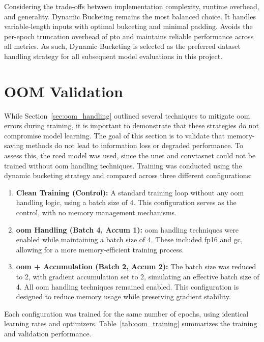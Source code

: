 Considering the trade-offs between implementation complexity, runtime overhead, and generality. Dynamic Bucketing remains the most balanced choice. It handles variable-length inputs with optimal bukceting and minimal padding. Avoids the per-epoch truncation overhead of \gls{pto} and maintains reliable performance across all metrics. As such, Dynamic Bucketing is selected as the preferred dataset handling strategy for all subsequent model evaluations in this project.

\section{OOM Validation}
\label{sec:oom_validation}

While Section~\ref{sec:oom_handling} outlined several techniques to mitigate \gls{oom} errors during training, it is important to demonstrate that these strategies do not compromise model learning. The goal of this section is to validate that memory-saving methods do not lead to information loss or degraded performance. To assess this, the \gls{rced} model was used, since the \gls{unet} and \gls{convtasnet} could not be trained without \gls{oom} handling techniques. Training was conducted using the dynamic bucketing strategy and compared across three different configurations:

\begin{enumerate}
    \item \textbf{Clean Training (Control):} A standard training loop without any \gls{oom} handling logic, using a batch size of 4. This configuration serves as the control, with no memory management mechanisms.
    
    \item \textbf{\gls{oom} Handling (Batch 4, Accum 1):} \gls{oom} handling techniques were enabled while maintaining a batch size of 4. These included \gls{fp16} and \gls{gc}, allowing for a more memory-efficient training process.
    
    \item \textbf{\gls{oom} + Accumulation (Batch 2, Accum 2):} The batch size was reduced to 2, with gradient accumulation set to 2, simulating an effective batch size of 4. All \gls{oom} handling techniques remained enabled. This configuration is designed to reduce memory usage while preserving gradient stability.
\end{enumerate}

Each configuration was trained for the same number of epochs, using identical learning rates and optimizers. Table~\ref{tab:oom_training} summarizes the training and validation performance.

